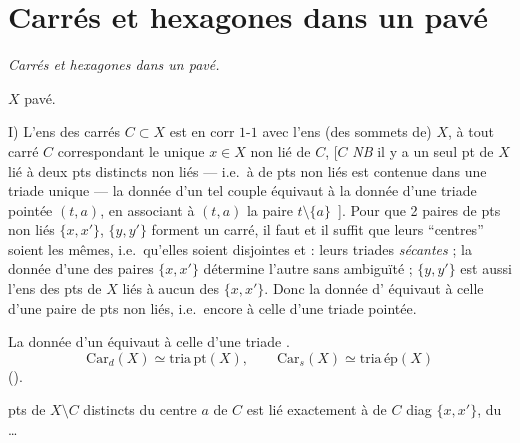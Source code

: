 \documentclass[11pt,a4paper]{article}
\begin{document}
\section{Carrés et hexagones dans un pavé}

\emph{Carrés et hexagones dans un pavé.}

$X$ pavé.

I) L'ens des carrés $C\subset X$ est en corr $1$-$1$ avec l'ens (des sommets de) $X$, à tout carré $C$ correspondant le  unique  $x\in X$ non lié   de $C$, [$C$ \emph{NB} il y a un seul pt de $X$  lié à  deux pts distincts non liés --- i.e.\ à   de pts  non liés est contenue dans une triade unique --- la donnée d'un tel couple équivaut  à la donnée d'une triade pointée $(t,a)$, en associant à $(t,a)$ la paire $t\setminus\{a\}$~]. Pour que 2 paires de pts non liés $\{x,x'\}$, $\{y,y'\}$ forment un carré, il faut et il suffit que  leurs ``centres'' soient les mêmes, i.e.\ qu'elles soient disjointes et  : leurs triades \emph{sécantes} ; la donnée d'une  des paires $\{x,x'\}$ détermine l'autre sans ambiguïté ; $\{y,y'\}$ est aussi l'ens des pts de $X$ liés à aucun des $\{x,x'\}$. Donc la donnée d' équivaut à celle d'une paire de pts non liés, i.e.\ encore à celle d'une triade pointée.

La donnée d'un  \ill{} équivaut à celle d'une triade .
\[
  \mathrm{Car}_{d}(X)\simeq \mathrm{tria\,pt}(X),\qquad
  \mathrm{Car}_{s}(X)\simeq \mathrm{tria\,ép}(X)
\]
().

  pts de $X\setminus C$ distincts du centre $a$ de $C$ est lié exactement à  de $C$ diag $\{x,x'\}$, du …
\end{document}
